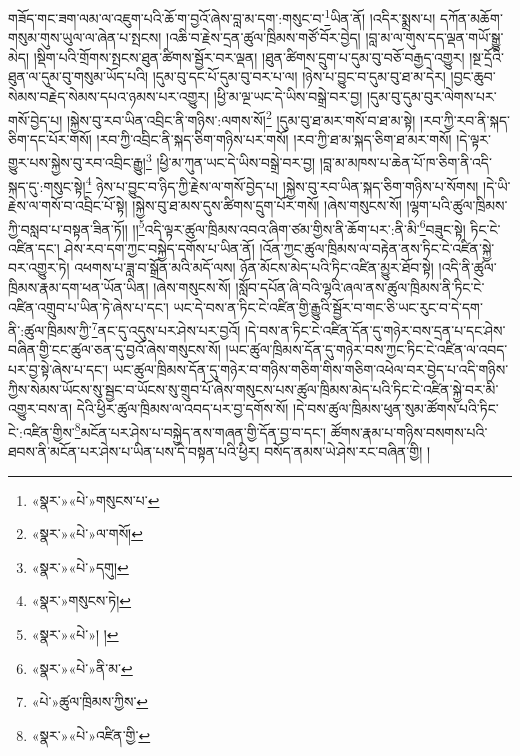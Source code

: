 གཟོད་གང་ཟག་ལམ་ལ་འཇུག་པའི་ཆོ་ག་བྱའོ་ཞེས་བླ་མ་དག་:གསུང་བ་\footnote{«སྣར་»«པེ་»གསུངས་པ་}ཡིན་ནོ། །འདིར་སྨྲས་པ། དཀོན་མཆོག་གསུམ་གུས་ཡུལ་ལ་ཞེན་པ་སྤངས། །འཆི་བ་རྗེས་དྲན་ཚུལ་ཁྲིམས་གཙོ་བོར་བྱེད། །བླ་མ་ལ་གུས་དད་ལྡན་གཡོ་སྒྱུ་མེད། །སྡིག་པའི་གྲོགས་སྤངས་ཐུན་ཚིགས་སྦྱོར་བར་ལྡན། །ཐུན་ཚིགས་དྲུག་པ་དུམ་བུ་བཅོ་བརྒྱད་འགྱུར། །སྔ་དྲོའི་ཐུན་ལ་དུམ་བུ་གསུམ་ཡོད་པའི། །དུམ་བུ་དང་པོ་དུམ་བུ་བར་པ་ལ། །ཉེས་པ་བྱུང་བ་དུམ་བུ་ཐ་མ་དེར། །བྱང་ཆུབ་སེམས་བརྗེད་སེམས་དཔའ་ཉམས་པར་འགྱུར། །ཕྱི་མ་ལྔ་ཡང་དེ་ཡིས་བསྒྲེ་བར་བྱ། །དུམ་བུ་དུམ་བུར་ལེགས་པར་གསོ་བྱེད་པ། །སྐྱེས་བུ་རབ་ཡིན་འབྲིང་ནི་གཉིས་:ལགས་སོ།\footnote{«སྣར་»«པེ་»ལ་གསོ།} །དུམ་བུ་ཐ་མར་གསོ་བ་ཐ་མ་སྟེ། །རབ་ཀྱི་རབ་ནི་སྐད་ཅིག་དང་པོར་གསོ། །རབ་ཀྱི་འབྲིང་ནི་སྐད་ཅིག་གཉིས་པར་གསོ། །རབ་ཀྱི་ཐ་མ་སྐད་ཅིག་ཐ་མར་གསོ། །དེ་ལྟར་གྱུར་པས་སྐྱེས་བུ་རབ་འབྲིང་རྒྱུ།\footnote{«སྣར་»«པེ་»དགུ།} །ཕྱི་མ་ཀུན་ཡང་དེ་ཡིས་བསྒྲེ་བར་བྱ། །བླ་མ་མཁས་པ་ཆེན་པོ་ཁ་ཅིག་ནི་འདི་སྐད་དུ་:གསུང་སྟེ།\footnote{«སྣར་»གསུངས་ཏེ།} ཉེས་པ་བྱུང་བ་ཉིད་ཀྱི་རྗེས་ལ་གསོ་བྱེད་པ། །སྐྱེས་བུ་རབ་ཡིན་སྐད་ཅིག་གཉིས་པ་སོགས། །དེ་ཡི་རྗེས་ལ་གསོ་བ་འབྲིང་པོ་སྟེ། །སྐྱེས་བུ་ཐ་མས་དུས་ཚིགས་དྲུག་པོར་གསོ། །ཞེས་གསུངས་སོ། །ལྷག་པའི་ཚུལ་ཁྲིམས་ཀྱི་བསླབ་པ་བསྟན་ཟིན་ཏོ།། །།\footnote{«སྣར་»«པེ་»། །}འདི་ལྟར་ཚུལ་ཁྲིམས་འབའ་ཞིག་ཙམ་གྱིས་ནི་ཆོག་པར་:ནི་མི་\footnote{«སྣར་»«པེ་»ནི་མ་}བཟུང་སྟེ། ཏིང་ངེ་འཛིན་དང་། ཤེས་རབ་དག་ཀྱང་བསྐྱེད་དགོས་པ་ཡིན་ནོ། །འོན་ཀྱང་ཚུལ་ཁྲིམས་ལ་བརྟེན་ནས་ཏིང་ངེ་འཛིན་སྐྱེ་བར་འགྱུར་ཏེ། འཕགས་པ་ཟླ་བ་སྒྲོན་མའི་མདོ་ལས། ཉོན་མོངས་མེད་པའི་ཏིང་འཛིན་མྱུར་ཐོབ་སྟེ། །འདི་ནི་ཚུལ་ཁྲིམས་རྣམ་དག་ཕན་ཡོན་ཡིན། །ཞེས་གསུངས་སོ། །སློབ་དཔོན་ཞི་བའི་ལྷའི་ཞལ་ནས་ཚུལ་ཁྲིམས་ནི་ཏིང་ངེ་འཛིན་འགྲུབ་པ་ཡིན་ཏེ་ཞེས་པ་དང་། ཡང་དེ་བས་ན་ཏིང་ངེ་འཛིན་གྱི་རྒྱུའི་སྦྱོར་བ་གང་ཅི་ཡང་རུང་བ་དེ་དག་ནི་:ཚུལ་ཁྲིམས་ཀྱི་\footnote{«པེ་»ཚུལ་ཁྲིམས་ཀྱིས་}ནང་དུ་འདུས་པར་ཤེས་པར་བྱའོ། །དེ་བས་ན་ཏིང་ངེ་འཛིན་དོན་དུ་གཉེར་བས་དྲན་པ་དང་ཤེས་བཞིན་གྱི་ངང་ཚུལ་ཅན་དུ་བྱའོ་ཞེས་གསུངས་སོ། །ཡང་ཚུལ་ཁྲིམས་དོན་དུ་གཉེར་བས་ཀྱང་ཏིང་ངེ་འཛིན་ལ་འབད་པར་བྱ་སྟེ་ཞེས་པ་དང་། ཡང་ཚུལ་ཁྲིམས་དོན་དུ་གཉེར་བ་གཉིས་གཅིག་གིས་གཅིག་འཕེལ་བར་བྱེད་པ་འདི་གཉིས་ཀྱིས་སེམས་ཡོངས་སུ་སྦྱང་བ་ཡོངས་སུ་གྲུབ་པོ་ཞེས་གསུངས་པས་ཚུལ་ཁྲིམས་མེད་པའི་ཏིང་ངེ་འཛིན་སྐྱེ་བར་མི་འགྱུར་བས་ན། དེའི་ཕྱིར་ཚུལ་ཁྲིམས་ལ་འབད་པར་བྱ་དགོས་སོ། །དེ་བས་ཚུལ་ཁྲིམས་ཕུན་སུམ་ཚོགས་པའི་ཏིང་ངེ་:འཛིན་གྱིས་\footnote{«སྣར་»«པེ་»འཛིན་གྱི་}མངོན་པར་ཤེས་པ་བསྐྱེད་ནས་གཞན་གྱི་དོན་བྱ་བ་དང་། ཚོགས་རྣམ་པ་གཉིས་བསགས་པའི་ཐབས་ནི་མངོན་པར་ཤེས་པ་ཡིན་པས་དེ་བསྟན་པའི་ཕྱིར། བསོད་ནམས་ཡེ་ཤེས་རང་བཞིན་གྱི། །
